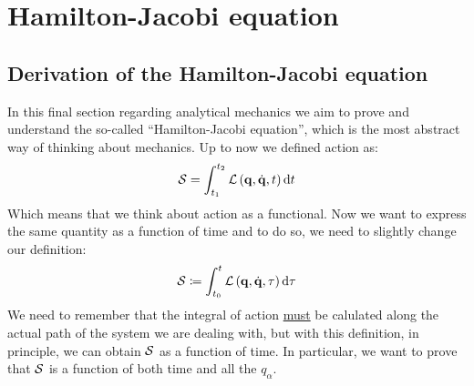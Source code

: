 \chapter[H-J Equation]{Hamilton-Jacobi equation}
\section{Derivation of the Hamilton-Jacobi equation}
In this final section regarding analytical mechanics we aim to prove and understand the so-called ``Hamilton-Jacobi equation'', which is the most abstract way of thinking about mechanics. Up to now we defined action as:
\begin{equation}
  \mathcal{S} = \int_{t_1}^{t_2}\mathcal{L}\left(\vb{q},\dot{\vb{q}},t\right) \dd{t}
\end{equation}
Which means that we think about action as a functional. Now we want to express the same quantity as a function of time and to do so, we need to slightly change our definition:
\begin{equation}
  \mathcal{S} \coloneqq \int_{t_0}^{t}\mathcal{L}\left(\vb{q},\dot{\vb{q}},\tau\right) \dd{\tau}
\end{equation}
We need to remember that the integral of action \underline{must} be calulated along the actual path of the system we are dealing with, but with this definition, in principle, we can obtain $\mathcal{S}$ as a function of time. In particular, we want to prove that $\mathcal{S}$ is a function of both time and all the $q_{\alpha}$.
